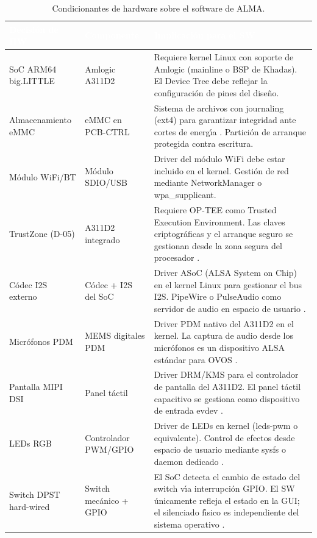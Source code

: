 \begin{table}[H]
  \centering
  \caption{Condicionantes de hardware sobre el software de ALMA.}
  \label{tab:hw_sw_condicionantes}
  \begin{tabularx}{\textwidth}{L{3.5cm} L{4cm} L{6cm}}
    \toprule
    \textcolor{white}{\textbf{Decisi\'{o}n de HW}} &
    \textcolor{white}{\textbf{Componente}} &
    \textcolor{white}{\textbf{Implicaci\'{o}n para el SW}} \\
    \midrule
    SoC ARM64 big.LITTLE & Amlogic A311D2 &
      Requiere kernel Linux con soporte de Amlogic (mainline o BSP de Khadas).
      El Device Tree debe reflejar la configuraci\'{o}n de pines del dise\~{n}o. \\
    Almacenamiento eMMC & eMMC en PCB-CTRL &
      Sistema de archivos con journaling (ext4) para garantizar integridad ante
      cortes de energ\'{\i}a . Partici\'{o}n de arranque
      protegida contra escritura. \\
    M\'{o}dulo WiFi/BT & M\'{o}dulo SDIO/USB &
      Driver del m\'{o}dulo WiFi debe estar incluido en el kernel. Gesti\'{o}n
      de red mediante NetworkManager o wpa\_supplicant. \\
    TrustZone (D-05) & A311D2 integrado &
      Requiere OP-TEE como Trusted Execution Environment. Las claves
      criptogr\'{a}ficas y el arranque seguro se gestionan desde la zona
      segura del procesador . \\
    C\'{o}dec I2S externo & C\'{o}dec + I2S del SoC &
      Driver ASoC (ALSA System on Chip) en el kernel Linux para gestionar
      el bus I2S. PipeWire o PulseAudio como servidor de audio en espacio
      de usuario . \\
    Micr\'{o}fonos PDM & MEMS digitales PDM &
      Driver PDM nativo del A311D2 en el kernel. La captura de audio desde
      los micr\'{o}fonos es un dispositivo ALSA est\'{a}ndar para OVOS
      . \\
    Pantalla MIPI DSI & Panel t\'{a}ctil &
      Driver DRM/KMS para el controlador de pantalla del A311D2. El panel
      t\'{a}ctil capacitivo se gestiona como dispositivo de entrada evdev
      . \\
    LEDs RGB & Controlador PWM/GPIO &
      Driver de LEDs en kernel (leds-pwm o equivalente). Control de efectos
      desde espacio de usuario mediante sysfs o daemon dedicado . \\
    Switch DPST hard-wired & Switch mec\'{a}nico + GPIO &
      El SoC detecta el cambio de estado del switch v\'{\i}a interrupci\'{o}n
      GPIO. El SW \'{u}nicamente refleja el estado en la GUI; el silenciado
      f\'{\i}sico es independiente del sistema operativo . \\
    \bottomrule
  \end{tabularx}
\end{table}

